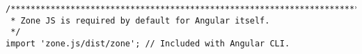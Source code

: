 \begin{verbatim}
/**************************************************************************
 * Zone JS is required by default for Angular itself.
 */
import 'zone.js/dist/zone'; // Included with Angular CLI.
\end{verbatim}
